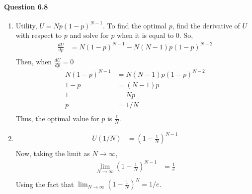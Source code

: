 \documentclass[12pt]{article}
\begin{document}
\paragraph{Question 6.8}
\begin{enumerate}[label={Part \alph*)},leftmargin=*,align=left]
	\item Utility, $U = Np(1-p)^{N-1}$. To find the optimal $p$, find the derivative of $U$ with respect to $p$ and solve for $p$ when it is equal to 0. So,
		\begin{align*}
			\frac{dU}{dp} & = N(1 - p )^{N-1} - N(N-1)p(1-p)^{N-2} \\
		\end{align*}
		Then, when $\frac{dU}{dp} = 0$
		\begin{align*}
			N(1-p)^{N-1} & = N(N-1)p(1 - p )^{N-2} \\
			1 - p  & = (N-1)p \\ 
			1 & = Np \\
			p & = 1/N \\
		\end{align*}
		Thus, the optimal value for $p$ is $\frac{1}{N}$. 
	\item
		\begin{align*}
			U( 1/N ) & = (1 - \frac{1}{N} )^{N - 1} \\
		\end{align*}
		Now, taking the limit as $N \rightarrow \infty$,
		\begin{align*}
			\lim_{N\to\infty}(1 - \frac{1}{N} )^{N - 1} & = \frac{1}{e} \\
		\end{align*}
		Using the fact that $\lim_{N\to\infty}(1 - \frac{1}{N})^{N} = 1/e$.
\end{enumerate}
\end{document}

